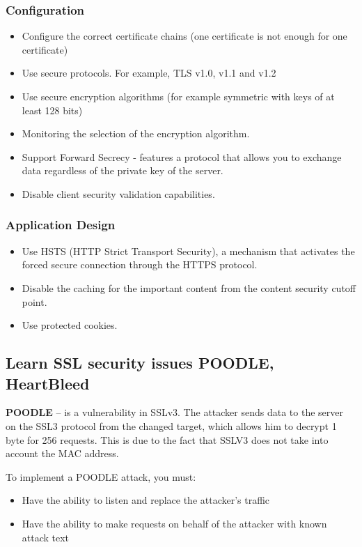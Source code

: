 \documentclass[14pt,a4paper,report]{report}
\begin{document}
\subsubsection{Configuration}

\begin{itemize}
	\item Configure the correct certificate chains (one certificate is not enough for one certificate)
	\item Use secure protocols. For example, TLS v1.0, v1.1 and v1.2
	\item Use secure encryption algorithms (for example symmetric with keys of at least 128 bits)
	\item Monitoring the selection of the encryption algorithm.
	\item Support Forward Secrecy - features a protocol that allows you to exchange data regardless of the private key of the server.
	\item Disable client security validation capabilities.
\end{itemize}

\subsubsection{Application Design}

\begin{itemize}
	\item Use HSTS (HTTP Strict Transport Security), a mechanism that activates the forced secure connection through the HTTPS protocol.
	\item Disable the caching for the important content from the content security cutoff point.
	\item Use protected cookies.
\end{itemize}

\subsection{Learn SSL security issues POODLE, HeartBleed}

\textbf{POODLE} --  is a vulnerability in SSLv3. The attacker sends data to the server on the SSL3 protocol from the changed target, which allows him to decrypt 1 byte for 256 requests. This is due to the fact that SSLV3 does not take into account the MAC address.

To implement a POODLE attack, you must:

\begin{itemize}
	\item Have the ability to listen and replace the attacker’s traffic
	\item Have the ability to make requests on behalf of the attacker with known attack text
\end{itemize}
\end{document}
